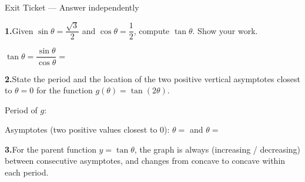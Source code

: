 \documentclass[10pt]{article}
\begin{document}
\namedateperiod

\vspace{0.10in}

\begin{notesbox}{Exit Ticket --- Answer independently}

\textbf{1.}\quad Given $\sin\theta = \dfrac{\sqrt{3}}{2}$ and $\cos\theta = \dfrac{1}{2}$,
compute $\tan\theta$.  Show your work.

\vspace{4pt}
$\tan\theta = \dfrac{\sin\theta}{\cos\theta} = $ \writeline

\vspace{0.14in}
\textbf{2.}\quad State the period and the location of the two positive vertical
asymptotes closest to $\theta = 0$ for the function $g(\theta) = \tan(2\theta)$.

\vspace{4pt}
Period of $g$: \writeline

\vspace{4pt}
Asymptotes (two positive values closest to 0): $\theta = $ \blank{2.2cm} and $\theta = $ \blank{2.2cm}

\vspace{0.14in}
\textbf{3.}\quad For the parent function $y = \tan\theta$, the graph is always
\underline{\hspace{2.2cm}} (increasing / decreasing) between consecutive
asymptotes, and changes from concave \underline{\hspace{2cm}} to concave
\underline{\hspace{2cm}} within each period.

\end{notesbox}
\end{document}
